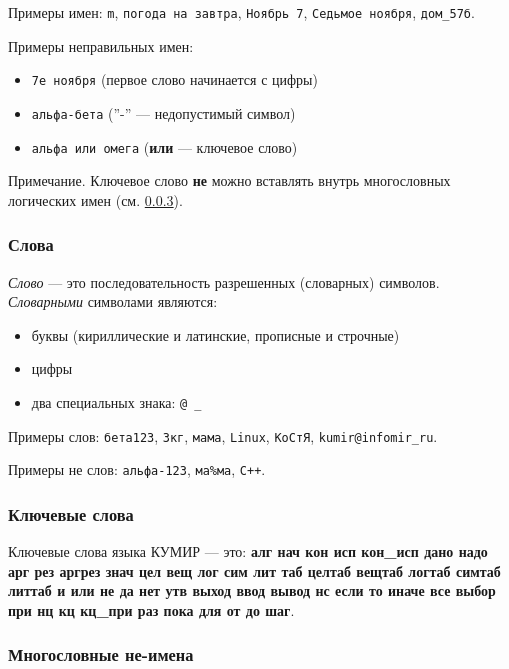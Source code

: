 Примеры имен: \texttt{m}, \texttt{погода на завтра}, \texttt{Ноябрь 7}, \texttt{Седьмое ноября}, \texttt{дом\_57б}.

	Примеры неправильных имен:
\begin{itemize}
\item \texttt{7е ноября} (первое слово начинается с цифры)
\item \texttt{альфа-бета} (''-'' --- недопустимый символ)
\item \texttt{альфа или омега} (\textbf{или} --- ключевое слово)
\end{itemize}

	Примечание. Ключевое слово \textbf{не} можно вставлять внутрь многословных логических имен (см. \ref{ne-names}).

\subsubsection{Слова}

	\emph{Слово} --- это последовательность разрешенных (словарных) символов. \label{ssymbols} \emph{Словарными} символами являются:
\begin{itemize}
\item буквы (кириллические и латинские, прописные и строчные)
\item цифры
\item два специальных знака: \texttt{@ \_}
\end{itemize}
	
	Примеры слов: \texttt{бета123}, \texttt{3кг}, \texttt{мама}, \texttt{Linux}, \texttt{КоСтЯ}, \texttt{kumir@infomir\_ru}.

	Примеры не слов: \texttt{альфа-123}, \texttt{ма\%ма}, \texttt{С++}.

\subsubsection{Ключевые слова}

	Ключевые слова языка КУМИР --- это: \textbf{алг нач кон исп кон\_исп \textbf{дано} надо арг рез аргрез знач цел вещ лог сим лит таб целтаб вещтаб логтаб симтаб литтаб и или не да нет утв выход ввод вывод нс если то иначе все выбор при нц кц кц\_при раз пока для от до шаг}.

\subsubsection{Многословные не-имена}
\label{ne-names}

